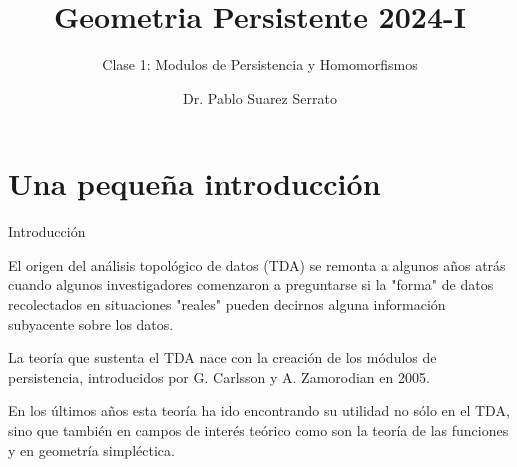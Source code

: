 \documentclass{beamer}
\title{Geometria Persistente 2024-I}
\subtitle{Clase 1: Modulos de Persistencia y Homomorfismos} %
\author{Dr. Pablo Suarez Serrato}
\begin{document}
\frenchspacing


  \frame{\maketitle}


    \section{Una pequeña introducción}
%
    \begin{frame}{Introducción}

El origen del análisis topológico de datos (TDA) se remonta a algunos años atrás cuando algunos investigadores comenzaron a preguntarse si la "forma" de datos recolectados en situaciones "reales" pueden decirnos alguna información subyacente sobre los datos. 
 \pause

La teoría que sustenta el TDA nace con la creación de los módulos de persistencia, introducidos por  G. Carlsson y A. Zamorodian en 2005.
 \pause
 
En los últimos años esta teoría ha ido encontrando su utilidad no sólo en el TDA, sino que también en campos de interés teórico como son la teoría de las funciones y en geometría simpléctica.

\end{frame}
    
%    
    
\end{document}
